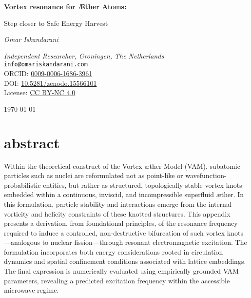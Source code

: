 \documentclass[a4paper, aps,preprint,superscriptaddress, 12pt]{revtex4}
\begin{document}
        \thispagestyle{empty}
        \centering
        \vspace*{2cm}

        {\Huge\bfseries Vortex resonance for Æther Atoms:\par}
        \vspace{0.5cm}
        {\Large Step closer to Safe Energy Harvest \par}
        \vspace{2cm}

        {\Large\itshape Omar Iskandarani\par}
        \vspace{0.5cm}
        \textit{Independent Researcher, Groningen, The Netherlands} \\
        \texttt{info@omariskandarani.com} \\
        ORCID: \href{https://orcid.org/0009-0006-1686-3961}{0009-0006-1686-3961} \\
        DOI: \href{https://doi.org/10.5281/zenodo.15566101}{10.5281/zenodo.15566101} \\
        License: \href{https://creativecommons.org/licenses/by/4.0/}{CC BY-NC 4.0} \\

        \vfill
        {\large \today\par}

        \vspace{1.5cm}

        \section*{abstract}
            Within the theoretical construct of the Vortex \ae{}ther Model (VAM), subatomic particles such as nuclei are reformulated not as point-like or wavefunction-probabilistic entities, but rather as structured, topologically stable vortex knots embedded within a continuous, inviscid, and incompressible superfluid \ae{}ther. In this formulation, particle stability and interactions emerge from the internal vorticity and helicity constraints of these knotted structures. This appendix presents a derivation, from foundational principles, of the resonance frequency required to induce a controlled, non-destructive bifurcation of such vortex knots—analogous to nuclear fission—through resonant electromagnetic excitation. The formulation incorporates both energy considerations rooted in circulation dynamics and spatial confinement conditions associated with lattice embeddings. The final expression is numerically evaluated using empirically grounded VAM parameters, revealing a predicted excitation frequency within the accessible microwave regime.
\end{document}
